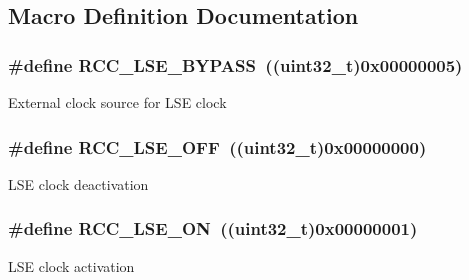 \subsection{Macro Definition Documentation}
\hypertarget{group___r_c_c___l_s_e___config_gaad580157edbae878edbcc83c5a68e767}{
\subsubsection[{R\-C\-C\-\_\-\-L\-S\-E\-\_\-\-B\-Y\-P\-A\-S\-S}]{\setlength{\rightskip}{0pt plus 5cm}\#define R\-C\-C\-\_\-\-L\-S\-E\-\_\-\-B\-Y\-P\-A\-S\-S~((uint32\-\_\-t)0x00000005)}}\label{group___r_c_c___l_s_e___config_gaad580157edbae878edbcc83c5a68e767}
External clock source for L\-S\-E clock \hypertarget{group___r_c_c___l_s_e___config_ga6645c27708d0cad1a4ab61d2abb24c77}{
\subsubsection[{R\-C\-C\-\_\-\-L\-S\-E\-\_\-\-O\-F\-F}]{\setlength{\rightskip}{0pt plus 5cm}\#define R\-C\-C\-\_\-\-L\-S\-E\-\_\-\-O\-F\-F~((uint32\-\_\-t)0x00000000)}}\label{group___r_c_c___l_s_e___config_ga6645c27708d0cad1a4ab61d2abb24c77}
L\-S\-E clock deactivation \hypertarget{group___r_c_c___l_s_e___config_gac981ea636c2f215e4473901e0912f55a}{
\subsubsection[{R\-C\-C\-\_\-\-L\-S\-E\-\_\-\-O\-N}]{\setlength{\rightskip}{0pt plus 5cm}\#define R\-C\-C\-\_\-\-L\-S\-E\-\_\-\-O\-N~((uint32\-\_\-t)0x00000001)}}\label{group___r_c_c___l_s_e___config_gac981ea636c2f215e4473901e0912f55a}
L\-S\-E clock activation 
